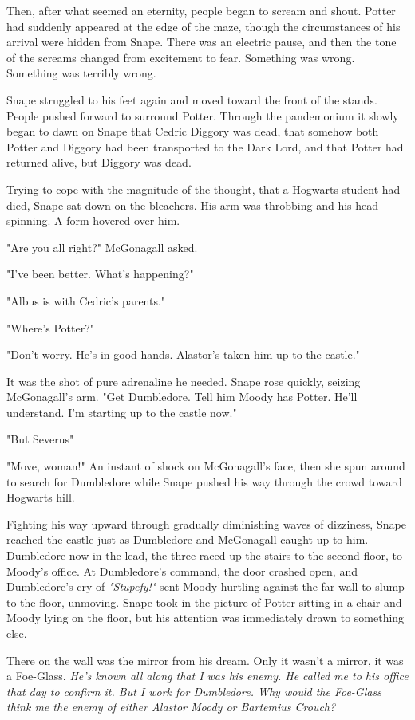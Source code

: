 Then, after what seemed an eternity, people began to scream and shout. Potter had suddenly appeared at the edge of the maze, though the circumstances of his arrival were hidden from Snape. There was an electric pause, and then the tone of the screams changed from excitement to fear. Something was wrong. Something was terribly wrong.

Snape struggled to his feet again and moved toward the front of the stands. People pushed forward to surround Potter. Through the pandemonium it slowly began to dawn on Snape that Cedric Diggory was dead, that somehow both Potter and Diggory had been transported to the Dark Lord, and that Potter had returned alive, but Diggory was dead.

Trying to cope with the magnitude of the thought, that a Hogwarts student had died, Snape sat down on the bleachers. His arm was throbbing and his head spinning. A form hovered over him.

"Are you all right?" McGonagall asked.

"I've been better. What's happening?"

"Albus is with Cedric's parents."

"Where's Potter?"

"Don't worry. He's in good hands. Alastor's taken him up to the castle."

It was the shot of pure adrenaline he needed. Snape rose quickly, seizing McGonagall's arm. "Get Dumbledore. Tell him Moody has Potter. He'll understand. I'm starting up to the castle now."

"But Severus{\el}"

"Move, woman!" An instant of shock on McGonagall's face, then she spun around to search for Dumbledore while Snape pushed his way through the crowd toward Hogwarts hill.

Fighting his way upward through gradually diminishing waves of dizziness, Snape reached the castle just as Dumbledore and McGonagall caught up to him. Dumbledore now in the lead, the three raced up the stairs to the second floor, to Moody's office. At Dumbledore's command, the door crashed open, and Dumbledore's cry of \emph{"Stupefy!"} sent Moody hurtling against the far wall to slump to the floor, unmoving. Snape took in the picture of Potter sitting in a chair and Moody lying on the floor, but his attention was immediately drawn to something else.

There on the wall was the mirror from his dream. Only it wasn't a mirror, it was a Foe-Glass. \emph{He's known all along that I was his enemy. He called me to his office that day to confirm it. But I work for Dumbledore. Why would the Foe-Glass think me the enemy of either Alastor Moody or Bartemius Crouch?}

